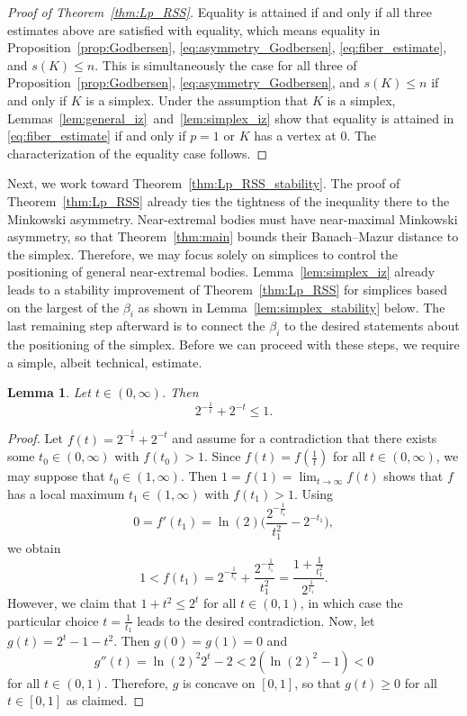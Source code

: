 \documentclass{amsart}
\newtheorem{lemma}[theorem]{Lemma}
\begin{document}
\begin{proof}[Proof of Theorem~\ref{thm:Lp_RSS}]
Equality is attained if and only if all three estimates above are satisfied with equality, which means equality in Proposition~\ref{prop:Godbersen}, \eqref{eq:asymmetry_Godbersen}, \eqref{eq:fiber_estimate}, and $s(K) \leq n$.
This is simultaneously the case for all three of Proposition~\ref{prop:Godbersen}, \eqref{eq:asymmetry_Godbersen}, and $s(K) \leq n$ if and only if $K$ is a simplex.
Under the assumption that $K$ is a simplex, Lemmas~\ref{lem:general_iz}~and~\ref{lem:simplex_iz} show that equality is attained in \eqref{eq:fiber_estimate} if and only if $p = 1$ or $K$ has a vertex at $0$.
The characterization of the equality case follows.
\end{proof}



Next, we work toward Theorem~\ref{thm:Lp_RSS_stability}.
The proof of Theorem~\ref{thm:Lp_RSS} already ties the tightness of the inequality there to the Minkowski asymmetry.
Near-extremal bodies must have near-maximal Minkowski asymmetry,
so that Theorem~\ref{thm:main} bounds their Banach--Mazur distance to the simplex.
Therefore, we may focus solely on simplices to control the positioning of general near-extremal bodies.
Lemma~\ref{lem:simplex_iz} already leads to a stability improvement of Theorem~\ref{thm:Lp_RSS} for simplices based on the largest of the $\beta_i$ as shown in Lemma~\ref{lem:simplex_stability} below.
The last remaining step afterward is to connect the $\beta_i$ to the desired statements about the positioning of the simplex.
Before we can proceed with these steps, we require a simple, albeit technical, estimate.



\begin{lemma}\label{lem:1/2_powers}
Let $t \in (0,\infty)$.
Then
\[
	2^{-\frac{1}{t}} + 2^{-t}
	\leq 1.
\]
\end{lemma}
\begin{proof}
Let $f(t) = 2^{-\frac{1}{t}} + 2^{-t}$ and assume for a contradiction that there exists some $t_0 \in (0,\infty)$ with $f(t_0) > 1$.
Since $f(t) = f(\frac{1}{t})$ for all $t \in (0,\infty)$, we may suppose that $t_0 \in (1,\infty)$.
Then $1 = f(1) = \lim_{t \to \infty} f(t)$ shows that $f$ has a local maximum $t_1 \in (1,\infty)$ with $f(t_1) > 1$.
Using
\[
	0
	= f'(t_1)
	= \ln(2) \bigg( \frac{2^{-\frac{1}{t_1}}}{t_1^2} - 2^{-t_1} \bigg),
\]
we obtain
\[
	1
	< f(t_1)
	= 2^{-\frac{1}{t_1}} + \frac{2^{-\frac{1}{t_1}}}{t_1^2}
	= \frac{1+\frac{1}{t_1^2}}{2^{\frac{1}{t_1}}}.
\]
However, we claim that $1 + t^2 \leq 2^t$ for all $t \in (0,1)$,
in which case the particular choice $t = \frac{1}{t_1}$ leads to the desired contradiction.
Now, let $g(t) = 2^t - 1 - t^2$.
Then $g(0) = g(1) = 0$ and
\[
	g''(t)
	= \ln(2)^2 2^t - 2
	< 2 (\ln(2)^2 - 1)
	< 0
\]
for all $t \in (0,1)$.
Therefore, $g$ is concave on $[0,1]$, so that $g(t) \geq 0$ for all $t \in [0,1]$ as claimed.
\end{proof}
\end{document}
